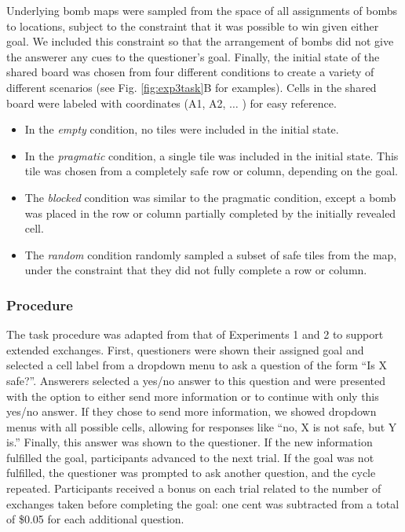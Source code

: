 \documentclass[12pt, floatsintext, jou]{apa6}
\begin{document}
Underlying bomb maps were sampled from the space of all assignments of bombs to locations,  subject to the constraint that it was possible to win given either goal. 
We included this constraint so that the arrangement of bombs did not give the answerer any cues to the questioner's goal.
Finally, the initial state of the shared board was chosen from four different conditions to create a variety of different scenarios (see Fig. \ref{fig:exp3task}B for examples).
Cells in the shared board were labeled with coordinates (A1, A2, $\dots$ ) for easy reference.
\begin{itemize}
\item In the \emph{empty} condition, no tiles were included in the initial state.
\item In the \emph{pragmatic} condition, a single tile was included in the initial state. This tile was chosen from a completely safe row or column, depending on the goal.%
\item The \emph{blocked} condition was similar to the pragmatic condition, except a bomb was placed in the row or column partially completed by the initially revealed cell. %
\item The \emph{random} condition randomly sampled a subset of safe tiles from the map, under the constraint that they did not fully complete a row or column. 
\end{itemize}

\subsubsection{Procedure}

The task procedure was adapted from that of Experiments 1 and 2 to support extended exchanges. 
First, questioners were shown their assigned goal and selected a cell label from a dropdown menu to ask a question of the form ``Is X safe?''. 
Answerers selected a yes/no answer to this question and were presented with the option to either send more information or to continue with only this yes/no answer.
If they chose to send more information, we showed dropdown menus with all possible cells, allowing for responses like ``no, X is not safe, but Y is.''
Finally, this answer was shown to the questioner.
If the new information fulfilled the goal, participants advanced to the next trial.
If the goal was not fulfilled, the questioner was prompted to ask another question, and the cycle repeated.
Participants received a bonus on each trial related to the number of exchanges taken before completing the goal: one cent was subtracted from a total of \$0.05 for each additional question.%
\end{document}
